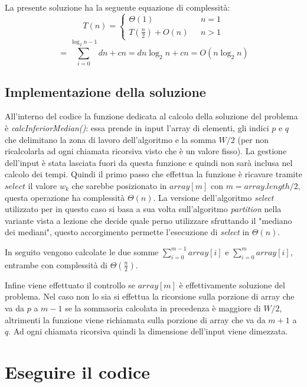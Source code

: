 \documentclass{article}
\begin{document}
La presente soluzione ha la seguente equazione di complessità:
\begin{equation*}
    T(n) = \begin{cases}
    \Theta (1) & \text{  $n = 1$}\\
    T(\frac{n}{2}) + O(n) & \text{  $n > 1$}
  \end{cases}
\end{equation*}
\begin{equation*}
  = \sum_{i = 0}^{\log_2 n - 1}   dn + cn = dn \log_2n + cn = O(n\log_2 n)
\end{equation*}

\subsection{Implementazione della soluzione}

All'interno del codice la funzione dedicata al calcolo della soluzione del problema è \textit{calcInferiorMedian()}: essa prende in input l'array di elementi, gli indici $p$ e $q$ che delimitano la zona di lavoro dell'algoritmo e la somma $W / 2$ (per non ricalcolarla ad ogni chiamata ricorsiva visto che è un valore fisso). La gestione dell'input è stata lasciata fuori da questa funzione e quindi non sarà inclusa nel calcolo dei tempi. Quindi il primo passo che effettua la funzione è ricavare tramite $select$ il valore $w_k$ che sarebbe posizionato in $array[m]$ con $m = array.length / 2$, questa operazione ha complessità $\Theta(n)$. La versione dell'algoritmo \textit{select} utilizzato per in questo caso si basa a sua volta sull'algoritmo \textit{partition} nella variante vista a lezione che decide quale perno utilizzare sfruttando il "mediano dei mediani", questo accorgimento permette l'esecuzione di \textit{select} in $\Theta(n)$.

In seguito vengono calcolate le due somme $\sum_{i = 0}^{m-1} array[i]$ e $\sum_{i = 0}^{m} array[i]$, entrambe con complessità di $\Theta(\frac{n}{2})$.

Infine viene effettuato il controllo se $array[m]$ è effettivamente soluzione del problema. Nel caso non lo sia si effettua la ricorsione sulla porzione di array che va da $p$ a $m-1$ se la sommaoria calcolata in precedenza è maggiore di $W/2$, altrimenti la funzione viene richiamata sulla porzione di array che va da $m+1$ a $q$. Ad ogni chiamata ricorsiva quindi la dimensione dell'input viene dimezzata.


\section{Eseguire il codice}
\end{document}
